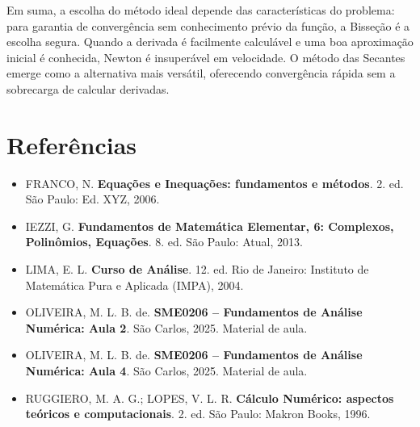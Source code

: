 \documentclass[12pt,a4paper]{article}
\begin{document}
Em suma, a escolha do método ideal depende das características do problema: para garantia de convergência sem conhecimento prévio da função, a Bisseção é a escolha segura. Quando a derivada é facilmente calculável e uma boa aproximação inicial é conhecida, Newton é insuperável em velocidade. O método das Secantes emerge como a alternativa mais versátil, oferecendo convergência rápida sem a sobrecarga de calcular derivadas.

\section*{Referências}
\begin{itemize}\itemsep0.3em
  \item FRANCO, N. \textbf{Equações e Inequações: fundamentos e métodos}. 2. ed. São Paulo: Ed. XYZ, 2006.
  \item IEZZI, G. \textbf{Fundamentos de Matemática Elementar, 6: Complexos, Polinômios, Equações}. 8. ed. São Paulo: Atual, 2013.
  \item LIMA, E. L. \textbf{Curso de Análise}. 12. ed. Rio de Janeiro: Instituto de Matemática Pura e Aplicada (IMPA), 2004.
  \item OLIVEIRA, M. L. B. de. \textbf{SME0206 -- Fundamentos de Análise Numérica: Aula 2}. São Carlos, 2025. Material de aula.
  \item OLIVEIRA, M. L. B. de. \textbf{SME0206 -- Fundamentos de Análise Numérica: Aula 4}. São Carlos, 2025. Material de aula.
  \item RUGGIERO, M. A. G.; LOPES, V. L. R. \textbf{Cálculo Numérico: aspectos teóricos e computacionais}. 2. ed. São Paulo: Makron Books, 1996.
\end{itemize}
\end{document}
